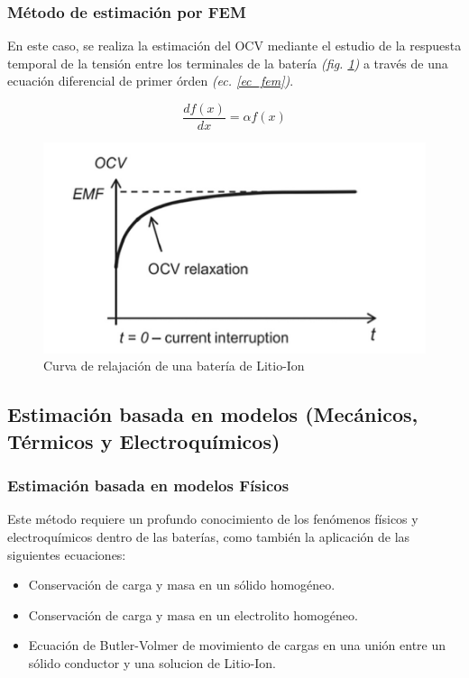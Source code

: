 \documentclass[10pt]{beamer}
\theoremstyle{remark}
\theoremstyle{definition}
\begin{document}
\begin{frame}[allowframebreaks]
	\frametitle{Método de estimación por FEM}

	En este caso, se realiza la estimación del OCV mediante el estudio de la
	respuesta temporal de la tensión entre los terminales de la batería
	\emph{(fig. \ref{fig:relax_emf})} a través
	de una ecuación diferencial de primer órden \emph{(ec. \ref{ec_fem})}.

	\begin{equation}
	  \frac{df(x)}{dx} = \alpha f(x)
	  \label{ec_fem}
	\end{equation}

	\begin{figure}[h!]
	  \centering
	  \includegraphics[width=1\textwidth]{./images/EMF_relaxation.png}
	  \caption{Curva de relajación de una batería de Litio-Ion}
	  \label{fig:relax_emf}
	\end{figure}

\end{frame}

\subsection{Estimación basada en modelos (Mecánicos, Térmicos y
Electroquímicos)}

\begin{frame}[allowframebreaks]
  \frametitle{Estimación basada en modelos Físicos}

	Este método requiere un profundo conocimiento de los fenómenos físicos y
	electroquímicos dentro de las baterías, como también la aplicación de las
	siguientes ecuaciones:

	\begin{itemize}
	  \item Conservación de carga y masa en un sólido homogéneo.
	  \item Conservación de carga y masa en un electrolito homogéneo.
	  \item Ecuación de Butler-Volmer de movimiento de cargas en una unión entre
		un sólido conductor y una solucion de Litio-Ion.
	\end{itemize}

\end{frame}
\end{document}
